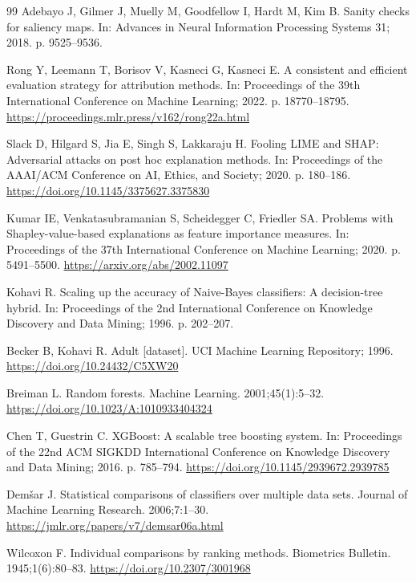 \documentclass[11pt,a4paper]{article}
\begin{document}
\begin{thebibliography}{99}
Adebayo J, Gilmer J, Muelly M, Goodfellow I, Hardt M, Kim B. Sanity checks
for saliency maps. In: Advances in Neural Information Processing Systems 31;
2018. p. 9525--9536.

Rong Y, Leemann T, Borisov V, Kasneci G, Kasneci E. A consistent and
efficient evaluation strategy for attribution methods. In: Proceedings of the
39th International Conference on Machine Learning; 2022. p. 18770--18795.
\url{https://proceedings.mlr.press/v162/rong22a.html}

Slack D, Hilgard S, Jia E, Singh S, Lakkaraju H. Fooling LIME and SHAP:
Adversarial attacks on post hoc explanation methods. In: Proceedings of the
AAAI/ACM Conference on AI, Ethics, and Society; 2020. p. 180--186.
\url{https://doi.org/10.1145/3375627.3375830}

Kumar IE, Venkatasubramanian S, Scheidegger C, Friedler SA. Problems with
Shapley-value-based explanations as feature importance measures. In:
Proceedings of the 37th International Conference on Machine Learning; 2020.
p. 5491--5500. \url{https://arxiv.org/abs/2002.11097}

Kohavi R. Scaling up the accuracy of Naive-Bayes classifiers: A
decision-tree hybrid. In: Proceedings of the 2nd International Conference on
Knowledge Discovery and Data Mining; 1996. p. 202--207.

Becker B, Kohavi R. Adult [dataset]. UCI Machine Learning Repository; 1996.
\url{https://doi.org/10.24432/C5XW20}

Breiman L. Random forests. Machine Learning. 2001;45(1):5--32.
\url{https://doi.org/10.1023/A:1010933404324}

Chen T, Guestrin C. XGBoost: A scalable tree boosting system. In: Proceedings
of the 22nd ACM SIGKDD International Conference on Knowledge Discovery and
Data Mining; 2016. p. 785--794.
\url{https://doi.org/10.1145/2939672.2939785}

Dem\v{s}ar J. Statistical comparisons of classifiers over multiple data
sets. Journal of Machine Learning Research. 2006;7:1--30.
\url{https://jmlr.org/papers/v7/demsar06a.html}

Wilcoxon F. Individual comparisons by ranking methods. Biometrics Bulletin.
1945;1(6):80--83. \url{https://doi.org/10.2307/3001968}


\end{thebibliography}
\end{document}
